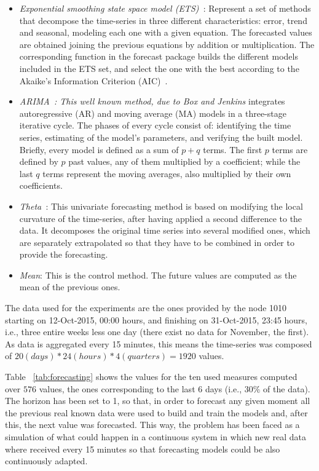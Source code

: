 \documentclass[preprint]{elsarticle}
\begin{document}
\begin{itemize}
\item {\em Exponential smoothing state space model (ETS)~\cite{ETS:2008}}: Represent a set of methods that decompose the time-series in three different characteristics: error, trend and seasonal, modeling each one with a given equation. The forecasted values are obtained joining the previous equations by addition or multiplication. The corresponding function in the forecast package builds the different models included in the ETS set, and select the one with the best according to the Akaike's Information Criterion (AIC)~\cite{Akaike1973}.
\item {\em ARIMA~\cite{BoxJenk}: This well known method, due to Box and Jenkins } integrates autoregressive (AR) and moving average (MA) models in a three-stage iterative cycle. The phases of every cycle consist of: identifying the time series, estimating of the model's parameters, and verifying the built model. Briefly, every model is defined as a sum of $p+q$ terms. The first $p$  terms are defined by $p$ past values, any of them multiplied by a coefficient; while the last $q$ terms represent the moving averages, also multiplied by their own coefficients.
\item {\em Theta~\cite{Assima2000}}: This univariate forecasting method is based on modifying the local curvature of the time-series, after having applied a second difference to the data. It decomposes the original time series into several modified ones, which are separately extrapolated so that they have to be combined in order to provide the forecasting.
\item {\em Mean}: This is the control method. The future values are computed as the mean of the previous ones.
\end{itemize}

The data used for the experiments are the ones provided by the node 1010 starting on 12-Oct-2015, 00:00 hours, and finishing on 31-Oct-2015, 23:45 hours, i.e., three entire weeks less one day (there exist no data for November, the first). As data is aggregated every 15 minutes, this means the time-series was composed of $20(days)*24(hours)*4(quarters)=1920$ values.



Table ~\ref{tab:forecasting} shows the values for the ten used measures computed over $576$ values, the ones corresponding to the last 6 days (i.e., $30\%$ of the data). The horizon has been set to 1, so that, in order to forecast any given moment all the previous real known data were used to build and train the models and, after this, the next value was forecasted. This way, the problem has been faced as a simulation of what could happen in a continuous system in which new real data where received every 15 minutes so that forecasting models could be also continuously adapted.
\end{document}
